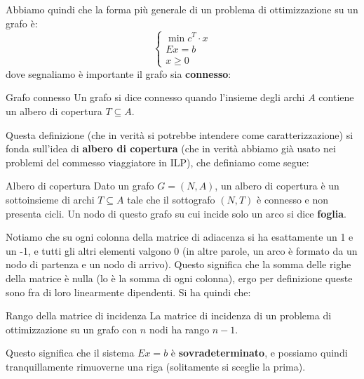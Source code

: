 \documentclass[a4paper,11pt]{article}
\begin{document}
\par\smallskip 

Abbiamo quindi che la forma più generale di un problema di ottimizzazione su un grafo è:
\[
	\begin{cases}
		\min c^T \cdot x \\ 
		Ex = b \\ 
		x \geq 0 
	\end{cases}
\]
dove segnaliamo è importante il grafo sia \textbf{connesso}:
\begin{definition}{Grafo connesso}
	Un grafo si dice connesso quando l'insieme degli archi $A$ contiene un albero di copertura $T \subseteq A$.
\end{definition}
Questa definizione (che in verità si potrebbe intendere come caratterizzazione) si fonda sull'idea di \textbf{albero di copertura} (che in verità abbiamo già usato nei problemi del commesso viaggiatore in ILP), che definiamo come segue:
\begin{definition}{Albero di copertura}
	Dato un grafo $G = (N, A)$, un albero di copertura è un sottoinsieme di archi $T \subseteq A$ tale che il sottografo $(N, T)$ è connesso e non presenta cicli. Un nodo di questo grafo su cui incide solo un arco si dice \textbf{foglia}.
\end{definition}

Notiamo che su ogni colonna della matrice di adiacenza si ha esattamente un 1 e un -1, e tutti gli altri elementi valgono 0 (in altre parole, un arco è formato da un nodo di partenza e un nodo di arrivo).
Questo significa che la somma delle righe della matrice è nulla (lo è la somma di ogni colonna), ergo per definizione queste sono fra di loro linearmente dipendenti.
Si ha quindi che:
\begin{theorem}{Rango della matrice di incidenza}
	La matrice di incidenza di un problema di ottimizzazione su un grafo con $n$ nodi ha rango $n-1$.
\end{theorem}

Questo significa che il sistema $Ex = b$ è \textbf{sovradeterminato}, e possiamo quindi tranquillamente rimuoverne una riga (solitamente si sceglie la prima).
\end{document}
